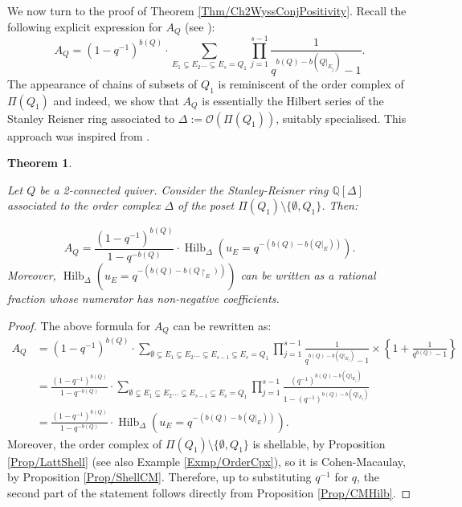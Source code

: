 \documentclass[11pt,english]{article}
\numberwithin{equation}{section}
\numberwithin{figure}{section}
\theoremstyle{definition}
\theoremstyle{plain}
\newtheorem{thm}[df]{Theorem}
\theoremstyle{remark}
\DeclareMathOperator{\Hilb}{Hilb}
\newcommand\QQ{\mathbb{Q}}
\begin{document}
We now turn to the proof of Theorem \ref{Thm/Ch2WyssConjPositivity}.
Recall the following explicit expression for $A_{Q}$ (see \cite[Cor. 4.35.]{Wys17b}):\[
A_Q=
(1-q^{-1})^{b(Q)}\cdot
\sum_{E_1\subsetneq E_2\ldots\subsetneq E_s=Q_1}\prod_{j=1}^{s-1}\frac{1}{q^{b(Q)-b(Q\vert_{E_j})}-1}.
\] The appearance of chains of subsets of $Q_{1}$ is reminiscent of
the order complex of $\Pi(Q_{1})$ and indeed, we show that $A_{Q}$
is essentially the Hilbert series of the Stanley Reisner ring associated
to $\Delta:=\mathcal{O}(\Pi(Q_{1}))$, suitably specialised. This
approach was inspired from \cite[Prop. 1.9.]{MV22}.

\begin{thm} \label{Thm/WyssConjPositivity}

Let $Q$ be a 2-connected quiver. Consider the Stanley-Reisner ring
$\QQ[\Delta]$ associated to the order complex $\Delta$ of the poset
$\Pi(Q_{1})\setminus\{\emptyset,Q_{1}\}$. Then:

\[
A_Q=\frac{(1-q^{-1})^{b(Q)}}{1-q^{-b(Q)}}\cdot\Hilb_{\Delta}\left(u_E=q^{-(b(Q)-b(Q\vert_E))}\right).
\] Moreover, $\Hilb_{\Delta}\left(u_{E}=q^{-(b(Q)-b(Q\restriction_{E}))}\right)$
can be written as a rational fraction whose numerator has non-negative
coefficients.

\end{thm}

\begin{proof}

The above formula for $A_{Q}$ \cite[Cor. 4.35.]{Wys17b} can be rewritten
as:\[
\begin{split}
A_Q & =
(1-q^{-1})^{b(Q)}\cdot\sum_{\emptyset\subsetneq E_1\subsetneq E_2\ldots\subsetneq E_{s-1}\subsetneq E_s=Q_1}\prod_{j=1}^{s-1}\frac{1}{q^{b(Q)-b(Q\vert_{E_j})}-1}\times\left\{ 1+\frac{1}{q^{b(Q)}-1}\right\} \\
& =
\frac{(1-q^{-1})^{b(Q)}}{1-q^{-b(Q)}}\cdot
\sum_{\emptyset\subsetneq E_1\subsetneq E_2\ldots\subsetneq E_{s-1}\subsetneq E_s=Q_1}\prod_{j=1}^{s-1}\frac{(q^{-1})^{b(Q)-b(Q\vert_{E_j})}}{1-(q^{-1})^{b(Q)-b(Q\vert_{E_j})}} \\
& = \frac{(1-q^{-1})^{b(Q)}}{1-q^{-b(Q)}}\cdot\Hilb_{\Delta}\left(u_E=q^{-(b(Q)-b(Q\vert_E))}\right).
\end{split}
\] Moreover, the order complex of $\Pi(Q_{1})\setminus\{\emptyset,Q_{1}\}$
is shellable, by Proposition \ref{Prop/LattShell} (see also Example
\ref{Exmp/OrderCpx}), so it is Cohen-Macaulay, by Proposition \ref{Prop/ShellCM}.
Therefore, up to substituting $q^{-1}$ for $q$, the second part
of the statement follows directly from Proposition \ref{Prop/CMHilb}.
\end{proof}
\end{document}

